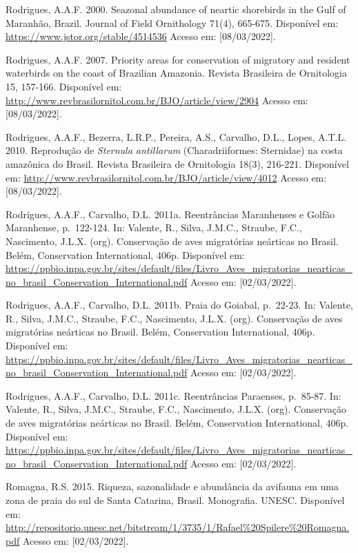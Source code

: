\documentclass[
  oneside]{scrbook}
\begin{document}
Rodrigues, A.A.F. 2000. Seazonal abundance of neartic shorebirds in the Gulf of Maranhão, Brazil. Journal of Field Ornithology 71(4), 665-675. Disponível em: \url{https://www.jstor.org/stable/4514536} Acesso em: {[}08/03/2022{]}.

Rodrigues, A.A.F. 2007. Priority areas for conservation of migratory and resident waterbirds on the coast of Brazilian Amazonia. Revista Brasileira de Ornitologia 15, 157-166. Disponível em: \url{http://www.revbrasilornitol.com.br/BJO/article/view/2904} Acesso em: {[}08/03/2022{]}.

Rodrigues, A.A.F., Bezerra, L.R.P., Pereira, A.S., Carvalho, D.L., Lopes, A.T.L. 2010. Reprodução de \emph{Sternula antillarum} (Charadriiformes: Sternidae) na costa amazônica do Brasil. Revista Brasileira de Ornitologia 18(3), 216-221. Disponível em: \url{http://www.revbrasilornitol.com.br/BJO/article/view/4012} Acesso em: {[}08/03/2022{]}.

Rodrigues, A.A.F., Carvalho, D.L. 2011a. Reentrâncias Maranhenses e Golfão Maranhense, p.~122-124. In: Valente, R., Silva, J.M.C., Straube, F.C., Nascimento, J.L.X. (org). Conservação de aves migratórias neárticas no Brasil. Belém, Conservation International, 406p. Disponível em: \url{https://ppbio.inpa.gov.br/sites/default/files/Livro_Aves_migratorias_nearticas_no_brasil_Conservation_International.pdf} Acesso em: {[}02/03/2022{]}.

Rodrigues, A.A.F., Carvalho, D.L. 2011b. Praia do Goiabal, p.~22-23. In: Valente, R., Silva, J.M.C., Straube, F.C., Nascimento, J.L.X. (org). Conservação de aves migratórias neárticas no Brasil. Belém, Conservation International, 406p. Disponível em: \url{https://ppbio.inpa.gov.br/sites/default/files/Livro_Aves_migratorias_nearticas_no_brasil_Conservation_International.pdf} Acesso em: {[}02/03/2022{]}.

Rodrigues, A.A.F., Carvalho, D.L. 2011c. Reentrâncias Paraenses, p.~85-87. In: Valente, R., Silva, J.M.C., Straube, F.C., Nascimento, J.L.X. (org). Conservação de aves migratórias neárticas no Brasil. Belém, Conservation International, 406p. Disponível em: \url{https://ppbio.inpa.gov.br/sites/default/files/Livro_Aves_migratorias_nearticas_no_brasil_Conservation_International.pdf} Acesso em: {[}02/03/2022{]}.

Romagna, R.S. 2015. Riqueza, sazonalidade e abundância da avifauna em uma zona de praia do sul de Santa Catarina, Brasil. Monografia. UNESC. Disponível em: \url{http://repositorio.unesc.net/bitstream/1/3735/1/Rafael\%20Spilere\%20Romagna.pdf} Acesso em: {[}02/03/2022{]}.
\end{document}
